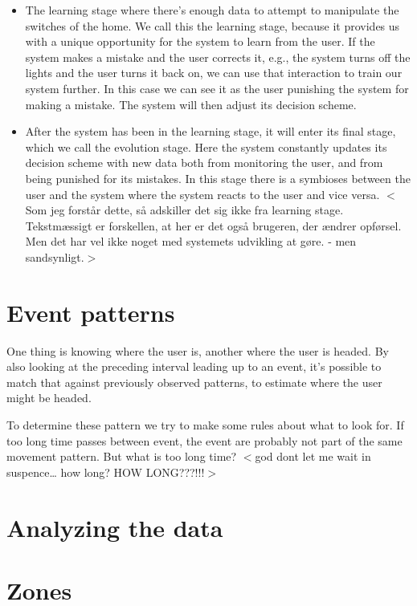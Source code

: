 \begin{itemize}
\item The learning stage where there's enough data to attempt to manipulate the switches of the home. We call this the learning stage, because it provides us with a unique opportunity for the system to learn from the user. If the system makes a mistake and the user corrects it, e.g., the system turns off the lights and the user turns it back on, we can use that interaction to train our system further. In this case we can see it as the user punishing the system for making a mistake. The system will then adjust its decision scheme. 

\item After the system has been in the learning stage, it will enter its final stage, which we call the evolution stage. Here the system constantly updates its decision scheme with new data both from monitoring the user, and from being punished for its mistakes. In this stage there is a symbioses between the user and the system where the system reacts to the user and vice versa. $<$Som jeg forstår dette, så adskiller det sig ikke fra learning stage. Tekstmæssigt er forskellen, at her er det også brugeren, der ændrer opførsel. Men det har vel ikke noget med systemets udvikling at gøre. - men sandsynligt.$>$

\end{itemize}

\section{Event patterns}
\label{eventpatterns}

One thing is knowing where the user is, another where the user is headed. By also looking at the preceding interval leading up to an event, it's possible to match that against previously observed patterns, to estimate where the user might be headed.

To determine these pattern we try to make some rules about what to look for. If too long time passes between event, the event are probably not part of the same movement pattern. But what is too long time? $<$god dont let me wait in suspence{\ldots} how long? HOW LONG???!!!$>$

\section{Analyzing the data}
\label{analyzingthedata}

\section{Zones}
\label{zones}

